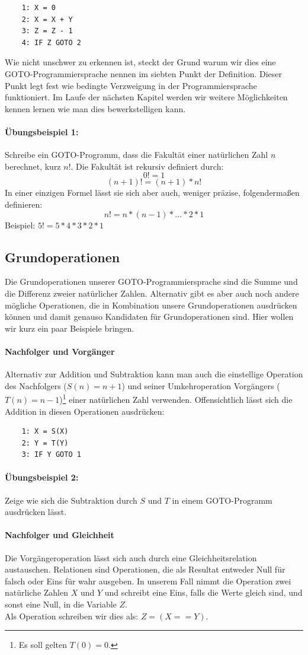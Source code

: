 \documentclass[11pt,a4paper,leqno]{report}
\numberwithin{equation}{chapter}
\begin{document}
\begin{lstlisting}
	1: X = 0
	2: X = X + Y
	3: Z = Z - 1
	4: IF Z GOTO 2
\end{lstlisting}			
Wie nicht unschwer zu erkennen ist, steckt der Grund warum wir dies eine GOTO-Programmiersprache nennen im siebten Punkt der Definition. Dieser Punkt legt fest wie bedingte Verzweigung in der Programmiersprache funktioniert. Im Laufe der n\"achsten Kapitel werden wir weitere M\"oglichkeiten kennen lernen wie man dies bewerkstelligen kann.
\paragraph{\"Ubungsbeispiel 1:} Schreibe ein GOTO-Programm, dass die Fakult\"at einer nat\"urlichen Zahl $n$ berechnet, kurz $n!$. Die Fakult\"at ist rekursiv definiert durch:
$$0! = 1$$
$$(n + 1)! = (n + 1) * n!$$
In einer einzigen Formel l\"asst sie sich aber auch, weniger pr\"azise, folgenderma\ss{}en definieren:
$$n! = n * (n - 1) * \dots * 2 * 1$$
Beispiel: $5! = 5 * 4 * 3 * 2 * 1$
\subsection{Grundoperationen}
Die Grundoperationen unserer GOTO-Programmiersprache sind die Summe und die Differenz zweier nat\"urlicher Zahlen. Alternativ gibt es aber auch noch andere m\"ogliche Operationen, die in Kombination unsere Grundoperationen ausdr\"ucken k\"onnen und damit genauso Kandidaten f\"ur Grundoperationen sind. Hier wollen wir kurz ein paar Beispiele bringen.
\paragraph{Nachfolger und Vorg\"anger}
Alternativ zur Addition und Subtraktion kann man auch die einstellige Operation des Nachfolgers ($S(n) = n + 1$) und seiner Umkehroperation Vorg\"angers ($T(n) = n - 1$)\footnote{Es soll gelten $T(0)=0$.} einer nat\"urlichen Zahl verwenden. Offensichtlich l\"asst sich die Addition in diesen Operationen ausdr\"ucken:
\begin{lstlisting}
	1: X = S(X)
	2: Y = T(Y)
	3: IF Y GOTO 1
\end{lstlisting}	
\paragraph{\"Ubungsbeispiel 2:} Zeige wie sich die Subtraktion durch $S$ und $T$ in einem GOTO-Programm ausdr\"ucken l\"asst.
\paragraph{Nachfolger und Gleichheit} Die Vorg\"angeroperation l\"asst sich auch durch eine Gleichheitsrelation austauschen. Relationen sind Operationen, die als Resultat entweder Null f\"ur falsch oder Eins f\"ur wahr ausgeben. In unserem Fall nimmt die Operation zwei nat\"urliche Zahlen $X$ und $Y$ und schreibt eine Eins, falls die Werte gleich sind, und sonst eine Null, in die Variable $Z$. \\Als Operation schreiben wir dies als: $Z = (X == Y)$.
\end{document}

